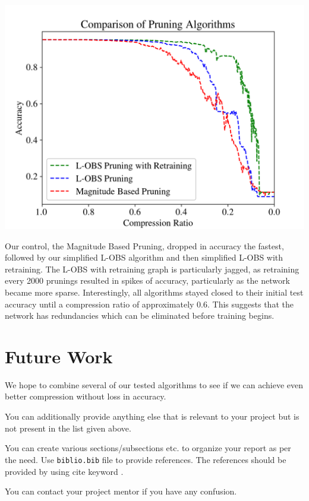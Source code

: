 \documentclass{article}
\begin{document}
\includegraphics[scale=0.65]{Comparison}

Our control, the Magnitude Based Pruning, dropped in accuracy the fastest, followed by our simplified L-OBS algorithm and then simplified L-OBS with retraining. The L-OBS with retraining graph is particularly jagged, as retraining every 2000 prunings resulted in spikes of accuracy, particularly as the network became more sparse. Interestingly, all algorithms stayed closed to their initial test accuracy until a compression ratio of approximately 0.6. This suggests that the network has redundancies which can be eliminated before training begins.

\section{Future Work}
\label{Future Work}

We hope to combine several of our tested algorithms to see if we can achieve even better compression without loss in accuracy.

You can additionally provide anything else that is relevant to your project but is not present in the list given above. 

You can create various sections/subsections etc. to organize your report as per the need. Use \texttt{biblio.bib} file to provide references. The references should be provided by using cite keyword \cite{langley00}.

You can contact your project mentor if you have any confusion.


\newpage
\end{document}
